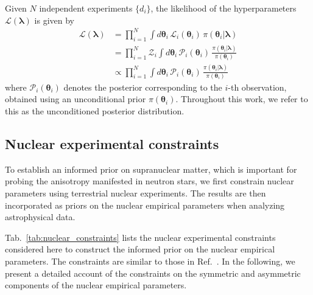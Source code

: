 \documentclass[prd,twocolumn,a4paper,floatfix,nofootinbib,preprintnumbers,superscriptaddress]{revtex4-1}
\begin{document}
Given $N$ independent experiments $\{d_i\}$, the likelihood of the hyperparameters $\mathcal{L}(\boldsymbol{\lambda})$ is given by
\begin{equation}
\begin{aligned}
    \mathcal{L}(\boldsymbol{\lambda}) &= \prod_{i=1}^N \int d\boldsymbol{\theta}_i\, \mathcal{L}_i(\boldsymbol{\theta}_i)\, \pi(\boldsymbol{\theta}_i|\boldsymbol{\lambda})\\
    &=\prod_{i=1}^N \mathcal{Z}_i\int d\boldsymbol{\theta}_i\, \mathcal{P}_i(\boldsymbol{\theta}_i)\, \frac{\pi(\boldsymbol{\theta}_i|\boldsymbol{\lambda})}{\pi(\boldsymbol{\theta}_i)}\\
    &\propto\prod_{i=1}^N \int d\boldsymbol{\theta}_i\, \mathcal{P}_i(\boldsymbol{\theta}_i)\, \frac{\pi(\boldsymbol{\theta}_i|\boldsymbol{\lambda})}{\pi(\boldsymbol{\theta}_i)}
\end{aligned}
\label{eq:hyperparameter_likelihood}
\end{equation}
where $\mathcal{P}_i(\boldsymbol{\theta}_i)$ denotes the posterior corresponding to the $i$-th observation, obtained using an unconditional prior $\pi(\boldsymbol{\theta}_i)$. Throughout this work, we refer to this as the unconditioned posterior distribution.

\subsection{Nuclear experimental constraints}
\label{sec:nuclear_constraints}
To establish an informed prior on supranuclear matter, which is important for probing the anisotropy manifested in neutron stars, we first constrain nuclear parameters using terrestrial nuclear experiments. The results are then incorporated as priors on the nuclear empirical parameters when analyzing astrophysical data.

Tab.~\ref{tab:nuclear_constraints} lists the nuclear experimental constraints considered here to construct the informed prior on the nuclear empirical parameters. The constraints are similar to those in Ref.~\cite{Tsang:2023vhh}.
In the following, we present a detailed account of the constraints on the symmetric and asymmetric components of the nuclear empirical parameters.
\end{document}
